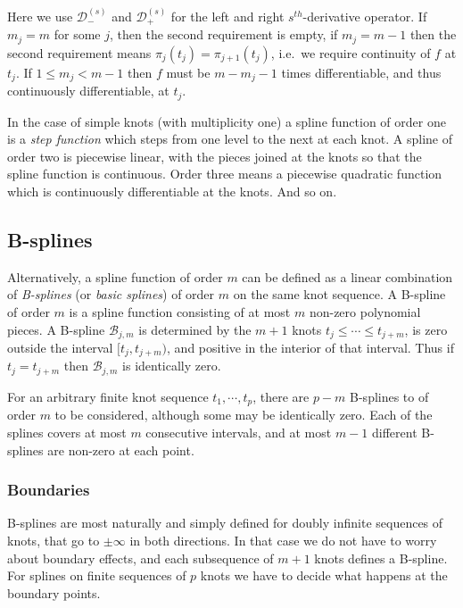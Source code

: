 \documentclass[
  12pt,
]{book}
\theoremstyle{definition}
\theoremstyle{definition}
\theoremstyle{definition}
\theoremstyle{definition}
\theoremstyle{remark}
\begin{document}
Here we use \(\mathcal{D}^{(s)}_-\) and \(\mathcal{D}^{(s)}_+\) for the left and right \(s^{th}\)-derivative operator. If \(m_j=m\) for some \(j\), then the second requirement is empty, if \(m_j=m-1\) then the second requirement means \(\pi_j(t_j)=\pi_{j+1}(t_j)\), i.e.~we require continuity of \(f\) at \(t_j\). If \(1\leq m_j<m-1\) then \(f\) must be \(m-m_j-1\) times differentiable, and thus continuously differentiable, at \(t_j\).

In the case of simple knots (with multiplicity one) a spline function of order one is a \emph{step function} which steps from one level to the next at each knot. A spline of order two is piecewise linear, with the pieces joined at the knots so that the spline function is continuous. Order three means a piecewise quadratic function which is continuously differentiable at the knots. And so on.

\hypertarget{mathbsplines}{%
\subsection{B-splines}\label{mathbsplines}}

Alternatively, a spline function of order \(m\) can be defined as a linear combination of \emph{B-splines} (or \emph{basic splines}) of order \(m\) on the same knot sequence. A B-spline of order \(m\) is a spline function consisting of at most \(m\) non-zero polynomial pieces. A B-spline \(\mathcal{B}_{j,m}\) is determined by the \(m+1\) knots \(t_j\leq\cdots\leq t_{j+m}\), is zero outside the interval \([t_j,t_{j+m})\), and positive in the interior of that interval. Thus if \(t_j=t_{j+m}\) then \(\mathcal{B}_{j,m}\) is identically zero.

For an arbitrary finite knot sequence \(t_1,\cdots,t_p\), there are \(p-m\) B-splines to of order \(m\) to be considered, although some may be identically zero. Each of the splines covers at most \(m\) consecutive intervals, and at most \(m-1\) different B-splines are non-zero at each point.

\hypertarget{mathbboundaries}{%
\subsubsection{Boundaries}\label{mathbboundaries}}

B-splines are most naturally and simply defined for doubly infinite sequences of knots, that go to \(\pm\infty\) in both directions. In that case we do not have to worry about boundary effects, and each subsequence of \(m+1\) knots defines a B-spline. For splines on finite sequences of \(p\) knots we have to decide what happens at the boundary points.
\end{document}
